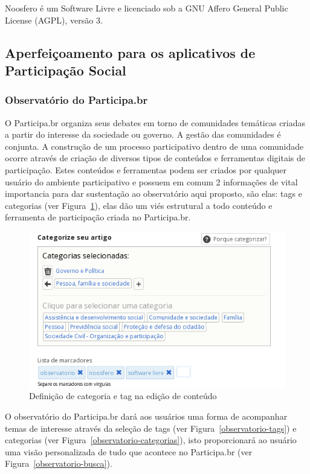 \documentclass[12pt]{article}
\begin{document}
Noosfero é um Software Livre e licenciado sob a GNU Affero General Public
License (AGPL), versão 3\cite{wikipediaSingleSignOn}.

\subsection{Aperfeiçoamento para os aplicativos de Participação Social}

\subsubsection{Observatório do Participa.br}

O Participa.br organiza seus debates em torno de comunidades temáticas criadas
a partir do interesse da sociedade ou governo. A gestão das comunidades é
conjunta. A construção de um processo participativo dentro de uma comunidade
ocorre através de criação de diversos tipos de conteúdos e ferramentas
digitais de participação. Estes conteúdos e ferramentas podem ser criados por
qualquer usuário do ambiente participativo e possuem em comum 2 informações de
vital importancia para dar sustentação ao observatório aqui proposto, são
elas: tags e categorias (ver Figura~\ref{categorias-tags}), elas dão um viés
estrutural a todo conteúdo e ferramenta de participação criada no
Participa.br.

\begin{figure}[h]
\center
\includegraphics[scale=0.6]{categorias-tags.png}
\caption{Definição de categoria e tag na edição de conteúdo}
\label{categorias-tags}
\end{figure}

O observatório do Participa.br dará aos usuários uma forma de acompanhar temas
de interesse através da seleção de tags (ver Figura~\ref{observatorio-tags}) e
categorias (ver Figura~\ref{observatorio-categorias}), isto proporcionará ao
usuário uma visão personalizada de tudo que acontece no Participa.br (ver
Figura~\ref{observatorio-busca}).
\end{document}

